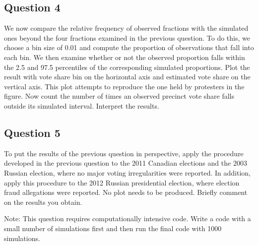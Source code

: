 \documentclass[]{article}
\begin{document}
\subsection{Question 4}\label{question-4}

We now compare the relative frequency of observed fractions with the
simulated ones beyond the four fractions examined in the previous
question. To do this, we choose a bin size of 0.01 and compute the
proportion of observations that fall into each bin. We then examine
whether or not the observed proportion falls within the 2.5 and 97.5
percentiles of the corresponding simulated proportions. Plot the result
with vote share bin on the horizontal axis and estimated vote share on
the vertical axis. This plot attempts to reproduce the one held by
protesters in the figure. Now count the number of times an observed
precinct vote share falls outside its simulated interval. Interpret the
results.

\subsection{Question 5}\label{question-5}

To put the results of the previous question in perspective, apply the
procedure developed in the previous question to the 2011 Canadian
elections and the 2003 Russian election, where no major voting
irregularities were reported. In addition, apply this procedure to the
2012 Russian presidential election, where election fraud allegations
were reported. No plot needs to be produced. Briefly comment on the
results you obtain.

Note: This question requires computationally intensive code. Write a
code with a small number of simulations first and then run the final
code with 1000 simulations.
\end{document}
